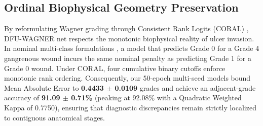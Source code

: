 \documentclass[journal]{IEEEtran}
\begin{document}
\subsection{Ordinal Biophysical Geometry Preservation}
By reformulating Wagner grading through Consistent Rank Logits (CORAL) \cite{cao2020rank}, DFU-WAGNER net respects the monotonic biophysical reality of ulcer invasion. In nominal multi-class formulations \cite{rostami2024deep, zhou2025deep}, a model that predicts Grade 0 for a Grade 4 gangrenous wound incurs the same nominal penalty as predicting Grade 1 for a Grade 0 wound. Under CORAL, four cumulative binary cutoffs enforce monotonic rank ordering. Consequently, our 50-epoch multi-seed models bound Mean Absolute Error to \textbf{0.4433 $\pm$ 0.0109} grades and achieve an adjacent-grade accuracy of \textbf{91.09 $\pm$ 0.71\%} (peaking at 92.08\% with a Quadratic Weighted Kappa of 0.7750), ensuring that diagnostic discrepancies remain strictly localized to contiguous anatomical stages.

\end{document}
